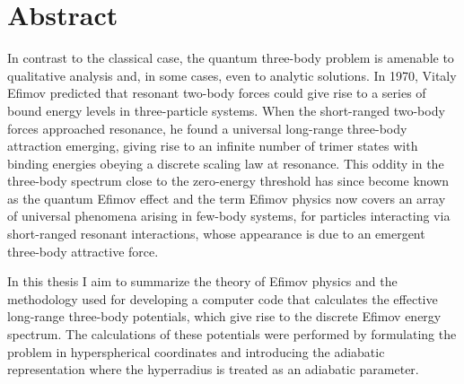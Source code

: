 \documentclass[a4paper,11pt]{book}
\begin{document}
 
\frontmatter

\begin{titlepage}
	
\end{titlepage}

\chapter*{Abstract}
In contrast to the classical case, the quantum three-body problem is amenable to qualitative analysis and, in some cases, even to analytic solutions. In 1970, Vitaly Efimov predicted that resonant two-body forces could give rise to a series of bound energy levels in three-particle systems. When the short-ranged two-body forces approached resonance, he found a universal long-range three-body attraction emerging, giving rise to an infinite number of trimer states with binding energies obeying a discrete scaling law at resonance. This oddity in the three-body spectrum close to the zero-energy threshold has since become known as the quantum Efimov effect and the term Efimov physics now covers an array of universal phenomena arising in few-body systems, for particles interacting via short-ranged resonant interactions, whose appearance is due to an emergent three-body attractive force. 

In this thesis I aim to summarize the theory of Efimov physics and the methodology used for developing a computer code that calculates the effective long-range three-body potentials, which give rise to the discrete Efimov energy spectrum. The calculations of these potentials were performed by formulating the problem in hyperspherical coordinates and introducing the adiabatic representation where the hyperradius is treated as an adiabatic parameter. 
\end{document}
